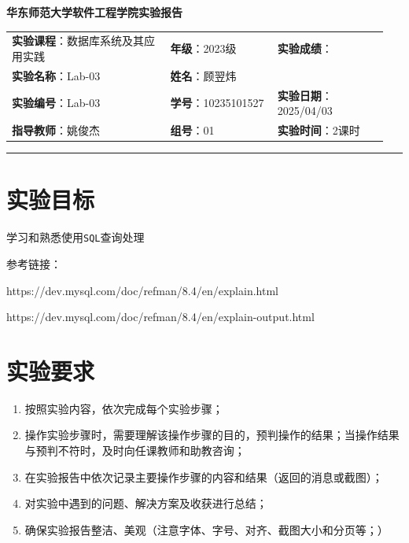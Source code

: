 \documentclass{article}
\begin{document}
	\begin{center}
		{\Large{\textbf{\heiti 华东师范大学软件工程学院实验报告}}}
		\begin{table}[htb]
			\flushleft
			\begin{tabular}{p{0.4\linewidth}p{0.27\linewidth}p{0.28\linewidth}}\\
				\textbf{实验课程}：数据库系统及其应用实践  & \textbf{年级}：2023级       & \textbf{实验成绩}：  \\
				\textbf{实验名称}：Lab-03 & \textbf{姓名}：顾翌炜         &                 \\
				\textbf{实验编号}：Lab-03     & \textbf{学号}：10235101527 & \textbf{实验日期}：2025/04/03  \\
				\textbf{指导教师}：姚俊杰     & \textbf{组号}：01            & \textbf{实验时间}：2课时  \\ 
			\end{tabular}
		\end{table}
	\end{center}
	\rule{\textwidth}{2pt}
	
	\section{实验目标}
	
	学习和熟悉使用\texttt{SQL}查询处理
	
	参考链接：
	
	https://dev.mysql.com/doc/refman/8.4/en/explain.html
	
	https://dev.mysql.com/doc/refman/8.4/en/explain-output.html
	
	\section{实验要求}
	
	\begin{enumerate}[noitemsep, label={{\arabic*})}]
		\item 按照实验内容，依次完成每个实验步骤；
		
		\item 操作实验步骤时，需要理解该操作步骤的目的，预判操作的结果；当操作结果与预判不符时，及时向任课教师和助教咨询；
		
		\item 在实验报告中依次记录主要操作步骤的内容和结果（返回的消息或截图）；
		
		\item 对实验中遇到的问题、解决方案及收获进行总结；
		
		\item 确保实验报告整洁、美观（注意字体、字号、对齐、截图大小和分页等；）
	\end{enumerate}\textbf{}
	
\end{document}
